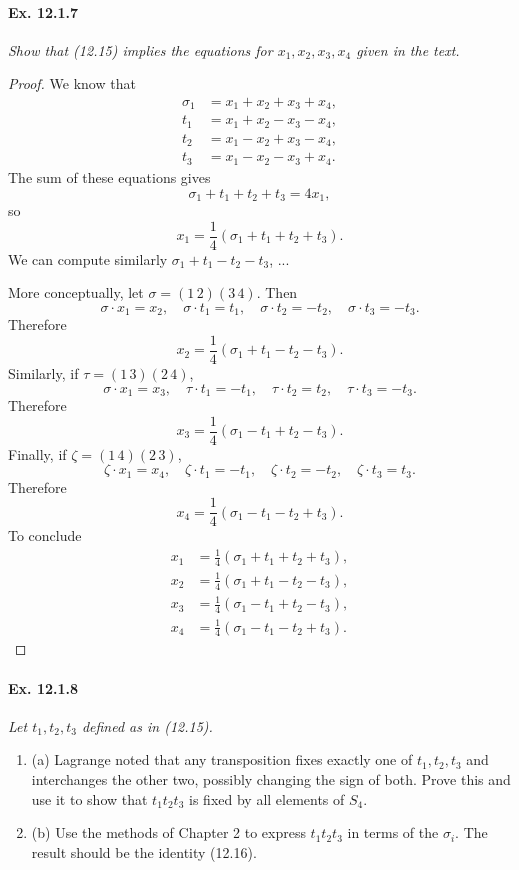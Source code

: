 \documentclass[11pt,a4paper]{article}
\newcommand{\be} {\begin{enumerate}}
\newcommand{\ee} {\end{enumerate}}
\begin{document}
\paragraph{Ex. 12.1.7}

{\it Show that (12.15) implies the equations for $x_1,x_2,x_3,x_4$ given in the text.
}

\begin{proof}
We know that
\begin{align*}
\sigma_1 &= x_1+x_2+x_3+x_4,\\
t_1 &= x_1+x_2-x_3-x_4,\\
t_2 &= x_1-x_2+x_3-x_4,\\
t_3 &= x_1-x_2-x_3+x_4.
\end{align*}
The sum of these equations gives
$$\sigma_1 + t_1 + t_2 + t_3 = 4x_1,$$
so
$$x_1=\frac{1}{4} \left(\sigma_1 + t_1 + t_2 + t_3 \right).$$
We can compute similarly $\sigma_1+t_1-t_2-t_3$, ...

More conceptually, let $\sigma = (1\,2)(3\,4)$. Then 
$$\sigma \cdot x_1 = x_2,\quad  \sigma \cdot t_1 = t_1,\quad  \sigma \cdot t_2 = -t_2,\quad \sigma \cdot t_3 = -t_3.$$
Therefore 
$$x_2 = \frac{1}{4} \left(\sigma_1 + t_1 - t_2 - t_3 \right).$$
Similarly, if $\tau = (1\,3)(2\,4)$,
$$\sigma \cdot x_1 = x_3,\quad  \tau \cdot t_1 = -t_1,\quad  \tau \cdot t_2 = t_2,\quad \tau \cdot t_3 = -t_3.$$
Therefore 
$$x_3 = \frac{1}{4} \left(\sigma_1 - t_1 + t_2 - t_3 \right).$$
Finally, if $\zeta = (1\,4)(2\,3)$,
$$\zeta \cdot x_1 = x_4,\quad  \zeta \cdot t_1 = -t_1,\quad  \zeta \cdot t_2 = -t_2,\quad \zeta \cdot t_3 = t_3.$$
Therefore 
$$x_4 = \frac{1}{4} \left(\sigma_1 - t_1 - t_2 + t_3 \right).$$
To conclude
\begin{align*}
x_1 &=\frac{1}{4} \left(\sigma_1 + t_1 + t_2 + t_3 \right),\\
x_2 &= \frac{1}{4} \left(\sigma_1 + t_1 - t_2 - t_3 \right),\\
x_3 &= \frac{1}{4} \left(\sigma_1 - t_1 + t_2 - t_3 \right),\\
x_4 &= \frac{1}{4} \left(\sigma_1 - t_1 - t_2 + t_3 \right).
\end{align*}
\end{proof}

\paragraph{Ex. 12.1.8}

{\it Let $t_1,t_2,t_3$ defined as in (12.15).
\be
\item[(a)]
Lagrange noted that any transposition fixes exactly one of $t_1,t_2,t_3$ and interchanges the other two, possibly changing the sign of both. Prove this and use it to show that $t_1t_2t_3$ is fixed by all elements of $S_4$.
\item[(b)]
Use the methods of Chapter 2 to express $t_1t_2t_3$ in terms of the $\sigma_i$. The result should be the identity (12.16).
\ee
}
\end{document}
